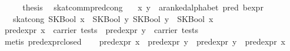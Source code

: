 \begin{isabellebody}
\ \ \isamarkupfalse%
\ \isamarkupfalse%
\ {}thesis\ \isamarkupfalse%
\isanewline
{}\isamarkupfalse%
%
\endisatagproof
{\isafoldproof}%
%
\isadelimproof
\isanewline
%
\endisadelimproof
\isanewline
{}\isamarkupfalse%
\ skat{}comm{}pred{}cong{}\isanewline
\ \ \ x\ y\ {}{}\ {}{}a{}{}ranked{}alphabet\ pred\ bexpr{}\isanewline
\ \ \ {}skat{}cong\ {}SKBool\ x\ {}\ SKBool\ y{}\ {}SKBool\ y\ {}\ SKBool\ x{}{}\isanewline
%
\isadelimproof
%
\endisadelimproof
%
\isatagproof
{}\isamarkupfalse%
\ {}\isanewline
\ \ \isamarkupfalse%
\ {}pred{}expr\ x\ {}\ carrier\ tests{}\ \ {}pred{}expr\ y\ {}\ carrier\ tests{}\isanewline
\ \ \ \ \isamarkupfalse%
\ {}metis\ pred{}expr{}closed{}{}\isanewline
\ \ \isamarkupfalse%
\ {}pred{}expr\ x\ {}\ pred{}expr\ y\ {}\ pred{}expr\ y\ {}\ pred{}expr\ x{}\isanewline

\end{isabellebody}
